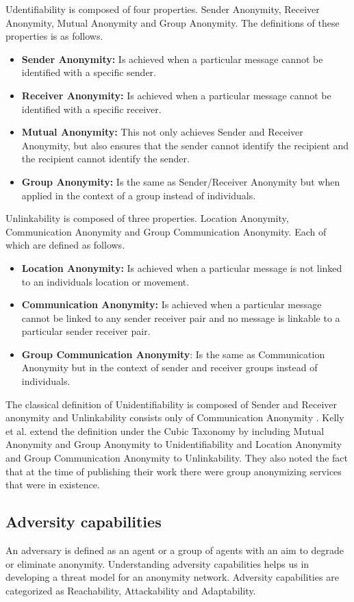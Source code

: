 \documentclass{llncs}
\begin{document}
Udentifiability is composed of four properties. Sender Anonymity, Receiver Anonymity, Mutual Anonymity and Group Anonymity. The definitions of these properties is as follows.
\begin{itemize}
\item[]{\textbf{Sender Anonymity:} Is achieved when a particular message cannot be identified with a specific sender.}
\item[]{\textbf{Receiver Anonymity:} Is achieved when a particular message cannot be identified with a specific receiver.}
\item[]{\textbf{Mutual Anonymity:} This not only achieves Sender and Receiver Anonymity, but also ensures that the sender cannot identify the recipient and the recipient cannot identify the sender.}
\item[]{\textbf{Group Anonymity:} Is the same as Sender/Receiver Anonymity but when applied in the context of a group instead of individuals.}
\end{itemize}

Unlinkability is composed of three properties. Location Anonymity, Communication Anonymity and Group Communication Anonymity. Each of which are defined as follows.
\begin{itemize}
	\item[]{\textbf{Location Anonymity:} Is achieved when a particular message is not linked to an individuals location or movement.}
	\item[]{\textbf{Communication Anonymity:} Is achieved when a particular message cannot be linked to any sender receiver pair and no message is linkable to a particular sender receiver pair.}
	\item[]{\textbf{Group Communication Anonymity}: Is the same as Communication Anonymity but in the context of sender and receiver groups instead of individuals.}
\end{itemize}

The classical definition of Unidentifiability is composed of Sender and Receiver anonymity and Unlinkability consists only of Communication Anonymity \cite{terminology}. Kelly et al. \cite{kelly2012exploring} extend the definition under the Cubic Taxonomy by including Mutual Anonymity and Group Anonymity to Unidentifiability and Location Anonymity and Group Communication Anonymity to Unlinkability. They also noted the fact that at the time of publishing their work there were group anonymizing services that were in existence.

\subsection{Adversity capabilities}
An adversary is defined as an agent or a group of agents with an aim to degrade or eliminate anonymity. Understanding adversity capabilities helps us in developing a threat model for an anonymity network. Adversity capabilities are categorized as Reachability, Attackability and Adaptability.
\end{document}
